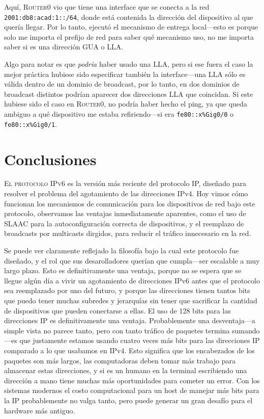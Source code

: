 \documentclass[a4paper,10pt]{corsage}
\newcommand{\ipaddress}[1]{\texttt{#1}}
\newcommand{\devname}[1]{\textsc{#1}}
\begin{document}
		Aquí, \devname{Router0} vio que tiene una interface que se conecta a la red \ipaddress{2001:db8:acad:1::/64}, donde está contenida la dirección del dispositivo al que quería llegar.  Por lo tanto, ejecutó el mecanismo de entrega local---esto es porque solo me importa el prefijo de red para saber qué mecanismo uso, no me importa saber si es una dirección GUA o LLA.

		Algo para notar es que \textit{podría} haber usado una LLA, pero si ese fuera el caso la mejor práctica hubiese sido especificar también la interface---una LLA sólo es válida dentro de un dominio de broadcast, por lo tanto, en dos dominios de broadcast distintos podrían aparecer dos direcciones LLA que coincidan.  Si este hubiese sido el caso en \devname{Router0}, no podría haber hecho el ping, ya que queda ambiguo a qué dispositivo me estaba refiriendo---si era \ipaddress{fe80::x\%Gig0/0} o \ipaddress{fe80::x\%Gig0/1}.

\chapter{Conclusiones}
	\lettrine{E}{l protocolo IPv6} es la versión más reciente del protocolo IP, diseñado para resolver el problema del agotamiento de las direcciones IPv4.  Hoy vimos cómo funcionan los mecanismos de comunicación para los dispositivos de red bajo este protocolo, observamos las ventajas inmediatamente aparentes, como el uso de SLAAC para la autoconfiguración correcta de dispositivos, y el reemplazo de broadcasts por multicasts dirgidos, para reducir el tráfico innecesario en la red.

	Se puede ver claramente reflejado la filosofía bajo la cual este protocolo fue diseñado, y el rol que sus desarolladores querían que cumpla---ser escalable a muy largo plazo.  Esto es definitivamente una ventaja, porque no se espera que se llegue algún día a vivir un agotamiento de direcciones IPv6 antes que el protocolo sea reemplazado por uno del futuro, y porque las direcciones tienen tantos bits que puedo tener muchas subredes y jerarquías sin tener que sacrificar la cantidad de dispositivos que pueden conectarse a ellas.  El uso de 128 bits para las direcciones IP es definitivamente una ventaja.  Probablemente una desventaja---a simple vista no parece tanto, pero con tanto tráfico de paquetes termina sumando---es que justamente estamos usando cuatro veces más bits para las direcciones IP comparado a lo que usabamos en IPv4.  Esto significa que los encabezados de los paquetes son más largos, las computadoras deben tomar más trabajo para almacenar estas direcciones, y si es un humano en la terminal escribiendo una dirección a mano tiene muchas más oportunidades para cometer un error.  Con los sistemas modernos el costo computacional para un host de manejar más bits para la IP probablemente no valga tanto, pero puede generar un gran desafío para el hardware más antiguo.
\end{document}
